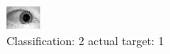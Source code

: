 \begin{figure}[h!]
\begin{center}
\includegraphics[width=0.60\columnwidth]{figures/ID1518_class_2_target_1.png}
\end{center}
\caption{ Classification: 2 actual target: 1}
\label{fig:ID1518_class_2_target_1}
\end{figure}
